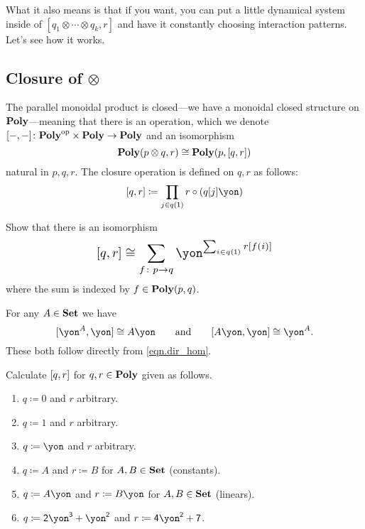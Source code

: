 \documentclass[Book-Poly]{subfiles}
\begin{document}
What it also means is that if you want, you can put a little dynamical system inside of $[q_1\otimes\cdots\otimes q_k,r]$ and have it constantly choosing interaction patterns. Let's see how it works.


\subsection{Closure of $\otimes$}%


The parallel monoidal product is closed---we have a monoidal closed structure on $\textbf{Poly}$---meaning that there is an operation, which we denote $[-,-]\colon\textbf{Poly}^{\textnormal{op}}\times\textbf{Poly}\to\textbf{Poly}$ and an isomorphism
\[
  \textbf{Poly}(p\otimes q,r)\cong\textbf{Poly}(p,[q,r])
\]
natural in $p,q,r$. The closure operation is defined on $q,r$ as follows:
\begin{equation}\label{eqn.dir_hom}
	\ihom{q,r}\coloneqq\prod_{j\in q(\1)}r\circ(q[j]\yon)
\end{equation}

\begin{exercise}
Show that there is an isomorphism
\[
\scalebox{1.3}{$\displaystyle
[q,r]\cong\sum_{f\colon p\to q}\yon^{\sum_{i\in q(\1)}r[f(i)]}
$}
\]
where the sum is indexed by $f\in\textbf{Poly}(p,q)$.
\end{exercise}

\begin{example}\label{ex.double_dual}
For any $A\in\textbf{Set}$ we have
\[
  \ihom{\yon^A,\yon}\cong A\yon
  \qqand
  \ihom{A\yon,\yon}\cong\yon^A.
\]
These both follow directly from \eqref{eqn.dir_hom}.
\end{example}

\begin{exercise}
Calculate $[q,r]$ for $q,r\in\textbf{Poly}$ given as follows.
\begin{enumerate}
	\item $q\coloneqq 0$ and $r$ arbitrary.
	\item $q\coloneqq 1$ and $r$ arbitrary.
	\item $q\coloneqq\yon$ and $r$ arbitrary.
	\item $q\coloneqq A$ and $r\coloneqq B$ for $A,B\in\textbf{Set}$ (constants).
	\item $q\coloneqq A\yon$ and $r\coloneqq B\yon$ for $A,B\in\textbf{Set}$ (linears).
	\item $q\coloneqq\2\yon^\3+\yon^\2$ and $r\coloneqq\4\yon^\2+\7$.
\qedhere
\end{enumerate}
\end{exercise}
\end{document}
